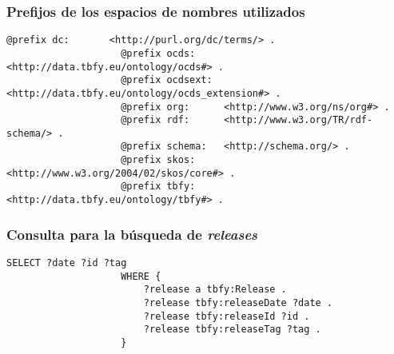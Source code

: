         \subsubsection{Prefijos de los espacios de nombres utilizados}
            \begin{minipage}{\linewidth}
                \begin{lstlisting}[language=lSPARQL]
                    @prefix dc:       <http://purl.org/dc/terms/> .
                    @prefix ocds:     <http://data.tbfy.eu/ontology/ocds#> .
                    @prefix ocdsext:  <http://data.tbfy.eu/ontology/ocds_extension#> .
                    @prefix org:      <http://www.w3.org/ns/org#> .
                    @prefix rdf:      <http://www.w3.org/TR/rdf-schema/> .
                    @prefix schema:   <http://schema.org/> .
                    @prefix skos:     <http://www.w3.org/2004/02/skos/core#> .
                    @prefix tbfy:     <http://data.tbfy.eu/ontology/tbfy#> .
                \end{lstlisting}
            \end{minipage}
            
        \subsubsection{Consulta para la búsqueda de \textit{releases}}
            \begin{minipage}{\linewidth}
                \begin{lstlisting}[language=lSPARQL]
                    SELECT ?date ?id ?tag
                    WHERE {
                        ?release a tbfy:Release .
                        ?release tbfy:releaseDate ?date .
                        ?release tbfy:releaseId ?id .
                        ?release tbfy:releaseTag ?tag .
                    }
                \end{lstlisting}
            \end{minipage}
        
